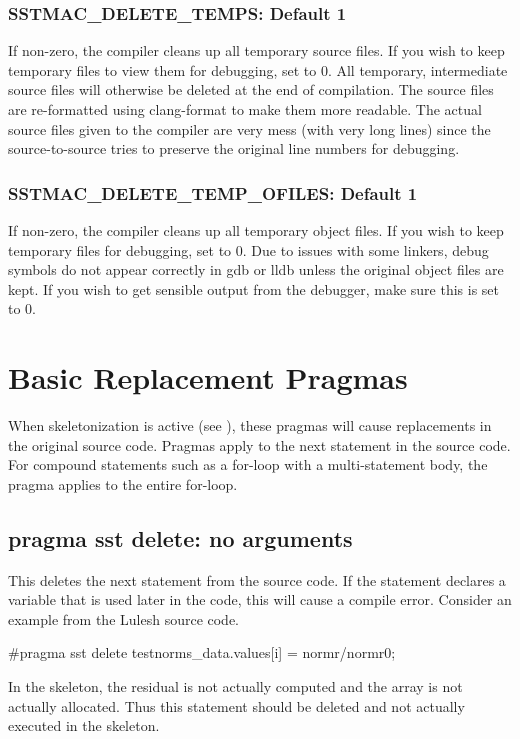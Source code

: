 \subsubsection{SSTMAC\_DELETE\_TEMPS: Default 1}
If non-zero, the compiler cleans up all temporary source files.
If you wish to keep temporary files to view them for debugging, set to 0.
All temporary, intermediate source files will otherwise be deleted at the end of compilation.
The source files are re-formatted using clang-format to make them more readable.
The actual source files given to the compiler are very mess (with very long lines) since the source-to-source tries to preserve the original line numbers for debugging.

\subsubsection{SSTMAC\_DELETE\_TEMP\_OFILES: Default 1}
If non-zero, the compiler cleans up all temporary object files.
If you wish to keep temporary files for debugging, set to 0.
Due to issues with some linkers, debug symbols do not appear correctly in gdb or lldb unless the original object files are kept.
If you wish to get sensible output from the debugger, make sure this is set to 0.

\section{Basic Replacement Pragmas}
When skeletonization is active (see ), these pragmas will cause replacements in the original source code.
Pragmas apply to the next statement in the source code.
For compound statements such as a for-loop with a multi-statement body, the pragma applies to the entire for-loop.
\subsection{pragma sst delete: no arguments}
This deletes the next statement from the source code.
If the statement declares a variable that is used later in the code, this will cause a compile error.
Consider an example from the Lulesh source code.

\begin{CppCode}
#pragma sst delete
    testnorms_data.values[i] = normr/normr0;
\end{CppCode}
In the skeleton, the residual is not actually computed and the  array is not actually allocated.
Thus this statement should be deleted and not actually executed in the skeleton.

